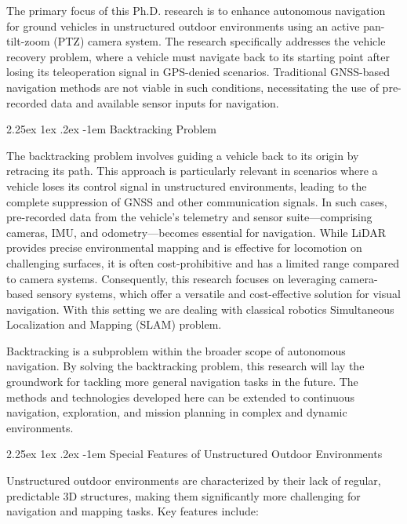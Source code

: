 \documentclass[runningheads]{llncs}
\makeatletter
\renewcommand\paragraph{\@startsection{paragraph}{4}{\z@}%
                                    {2.25ex \@plus1ex \@minus.2ex}%
                                    {-1em}%
                                    {\normalfont\normalsize\bfseries}}
\makeatother
\begin{document}
The primary focus of this Ph.D. research is to enhance autonomous navigation for ground vehicles in unstructured outdoor environments using an active pan-tilt-zoom (PTZ) camera system. The research specifically addresses the vehicle recovery problem, where a vehicle must navigate back to its starting point after losing its teleoperation signal in GPS-denied scenarios. Traditional GNSS-based navigation methods are not viable in such conditions, necessitating the use of pre-recorded data and available sensor inputs for navigation.

\paragraph{Backtracking Problem}

The backtracking problem involves guiding a vehicle back to its origin by retracing its path. This approach is particularly relevant in scenarios where a vehicle loses its control signal in unstructured environments, leading to the complete suppression of GNSS and other communication signals. In such cases, pre-recorded data from the vehicle's telemetry and sensor suite—comprising cameras, IMU, and odometry—becomes essential for navigation. While LiDAR provides precise environmental mapping and is effective for locomotion on challenging surfaces, it is often cost-prohibitive and has a limited range compared to camera systems. Consequently, this research focuses on leveraging camera-based sensory systems, which offer a versatile and cost-effective solution for visual navigation. With this setting we are dealing with classical robotics Simultaneous Localization and Mapping (SLAM) problem.

Backtracking is a subproblem within the broader scope of autonomous navigation. By solving the backtracking problem, this research will lay the groundwork for tackling more general navigation tasks in the future. The methods and technologies developed here can be extended to continuous navigation, exploration, and mission planning in complex and dynamic environments.

\paragraph{Special Features of Unstructured Outdoor Environments}

Unstructured outdoor environments are characterized by their lack of regular, predictable 3D structures, making them significantly more challenging for navigation and mapping tasks. Key features include:
\end{document}

